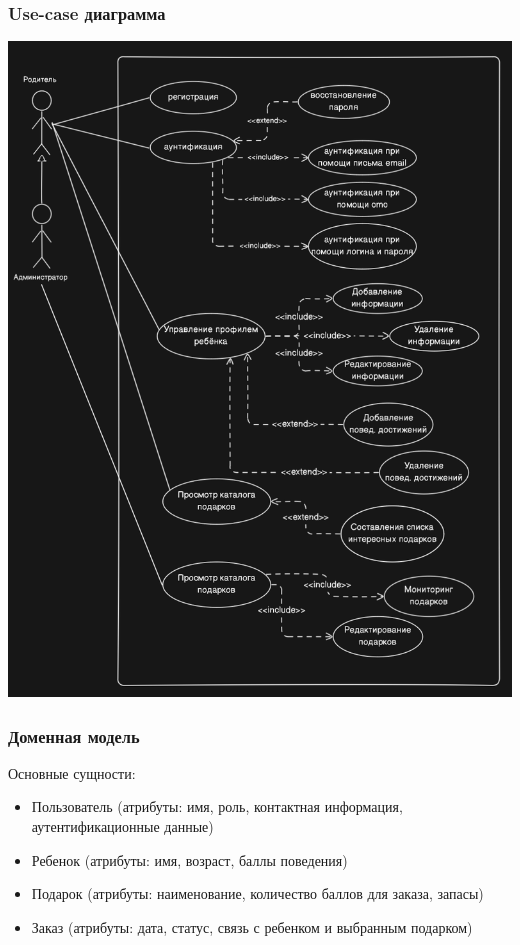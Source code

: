 \documentclass{article}
\begin{document}
\subsubsection{Use-case диаграмма}
\begin{center}
    \includegraphics[width=.7\textwidth]{use-case.png}
\end{center}
\subsubsection{Доменная модель}
Основные сущности:

\begin{itemize}
    \item Пользователь (атрибуты: имя, роль, контактная информация, аутентификационные данные)
    \item Ребенок (атрибуты: имя, возраст, баллы поведения)
    \item Подарок (атрибуты: наименование, количество баллов для заказа, запасы)
    \item Заказ (атрибуты: дата, статус, связь с ребенком и выбранным подарком)
\end{itemize}








\end{document}
